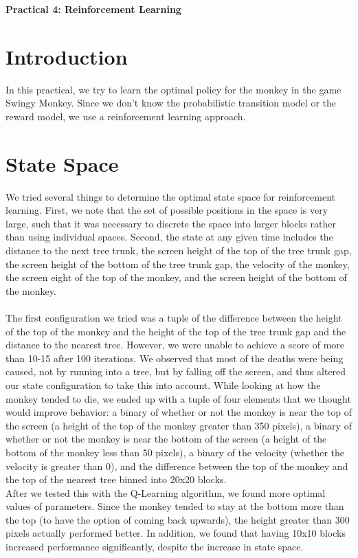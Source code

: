 \documentclass[10pt, oneside]{article}
\begin{document}
\centerline{\Large{\textbf{Practical 4: Reinforcement Learning}}}
\vspace{6px}
\section{Introduction}
In this practical, we try to learn the optimal policy for the monkey in the game Swingy Monkey. Since we don't know the probabilistic transition model or the reward model, we use a reinforcement learning approach. 
\section{State Space}
We tried several things to determine the optimal state space for reinforcement learning. First, we note that the set of possible positions in the space is very large, such that it was necessary to discrete the space into larger blocks rather than using individual spaces. Second, the state at any given time includes the distance to the next tree trunk, the screen height of the top of the tree trunk gap, the screen height of the bottom of the tree trunk gap, the velocity of the monkey, the screen eight of the top of the monkey, and the screen height of the bottom of the monkey. \\\\
The first configuration we tried was a tuple of the difference between the height of the top of the monkey and the height of the top of the tree trunk gap and the distance to the nearest tree. However, we were unable to achieve a score of more than 10-15 after 100 iterations. We observed that most of the deaths were being caused, not by running into a tree, but by falling off the screen, and thus altered our state configuration to take this into account. While looking at how the monkey tended to die, we ended up with a tuple of four elements that we thought would improve behavior: a binary of whether or not the monkey is near the top of the screen (a height of the top of the monkey greater than 350 pixels), a binary of whether or not the monkey is near the bottom of the screen (a height of the bottom of the monkey less than 50 pixels), a binary of the velocity (whether the velocity is greater than 0), and the difference between the top of the monkey and the top of the nearest tree binned into 20x20 blocks. \\

After we tested this with the Q-Learning algorithm, we found more optimal values of parameters. Since the monkey tended to stay at the bottom more than the top (to have the option of coming back upwards), the height greater than 300 pixels actually performed better. In addition, we found that having 10x10 blocks increased performance significantly, despite the increase in state space.
\end{document}
